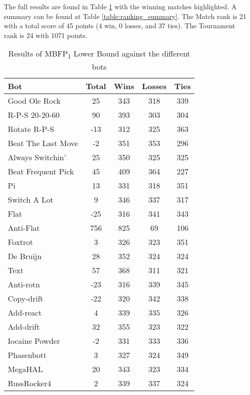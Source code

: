 The full results are found in Table \ref{table:JustMBFP_LowerBound_results} with the winning matches highlighted. A summary can be found at Table \ref{table:ranking_summary}. The Match rank is 21 with a total score of 45 points (4 win, 0 losses, and 37 ties). The Tournament rank is 24 with 1071 points.

\begin{table}
    \caption{Results of MBFP\textsubscript{1} Lower Bound against the different bots}
    \label{table:JustMBFP_LowerBound_results}
    \centering
    \begin{tabular}{|l|c|c|c|c|}
        \hline
        \textbf{Bot} & \textbf{Total} & \textbf{Wins} & \textbf{Losses} & \textbf{Ties} \\ \hline
Good Ole Rock & 25 & 343 & 318 & 339 \\ \hline 
\rowcolor{HighlightRowColor} R-P-S 20-20-60 & 90 & 393 & 303 & 304 \\ \hline 
Rotate R-P-S & -13 & 312 & 325 & 363 \\ \hline 
Beat The Last Move & -2 & 351 & 353 & 296 \\ \hline 
Always Switchin' & 25 & 350 & 325 & 325 \\ \hline 
Beat Frequent Pick & 45 & 409 & 364 & 227 \\ \hline 
Pi & 13 & 331 & 318 & 351 \\ \hline 
Switch A Lot & 9 & 346 & 337 & 317 \\ \hline 
Flat & -25 & 316 & 341 & 343 \\ \hline 
\rowcolor{HighlightRowColor} Anti-Flat & 756 & 825 & 69 & 106 \\ \hline 
Foxtrot & 3 & 326 & 323 & 351 \\ \hline 
De Bruijn & 28 & 352 & 324 & 324 \\ \hline 
\rowcolor{HighlightRowColor} Text & 57 & 368 & 311 & 321 \\ \hline 
Anti-rotn & -23 & 316 & 339 & 345 \\ \hline 
Copy-drift & -22 & 320 & 342 & 338 \\ \hline 
Add-react & 4 & 339 & 335 & 326 \\ \hline 
Add-drift & 32 & 355 & 323 & 322 \\ \hline 
Iocaine Powder & -2 & 331 & 333 & 336 \\ \hline 
Phasenbott & 3 & 327 & 324 & 349 \\ \hline 
MegaHAL & 20 & 343 & 323 & 334 \\ \hline 
RussRocker4 & 2 & 339 & 337 & 324 \\ \hline 

\end{tabular}
\end{table}
